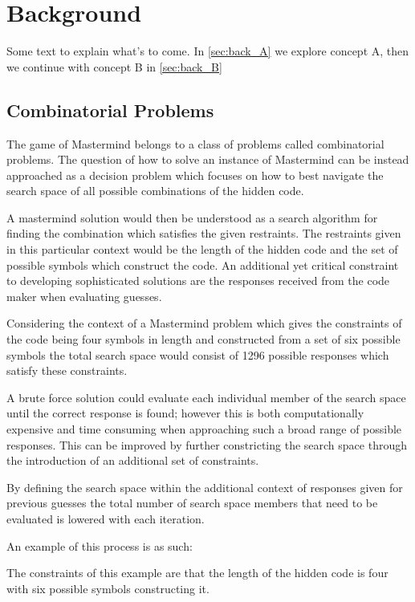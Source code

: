 \chapter{Background}
\label{cha:back}

Some text to explain what's to come. In \cref{sec:back_A} we explore concept A, then we continue with concept B in \cref{sec:back_B}

\section{Combinatorial Problems}

The game of Mastermind belongs to a class of problems called combinatorial problems. The question of how to solve an instance of Mastermind can be instead approached as a decision problem which focuses on how to best navigate the search space of all possible combinations of the hidden code.

A mastermind solution would then be understood as a search algorithm for finding the combination which satisfies the given restraints. The restraints given in this particular context would be the length of the hidden code and the set of possible symbols which construct the code. An additional yet critical constraint to developing sophisticated solutions are the responses received from the code maker when evaluating guesses.

Considering the context of a Mastermind problem which gives the constraints of the code being four symbols in length and constructed from a set of six possible symbols the total search space would consist of 1296 possible responses which satisfy these constraints.

A brute force solution could evaluate each individual member of the search space until the correct response is found; however this is both computationally expensive and time consuming when approaching such a broad range of possible responses. This can be improved by further constricting the search space through the introduction of an additional set of constraints.

By defining the search space within the additional context of responses given for previous guesses the total number of search space members that need to be evaluated is lowered with each iteration.

An example of this process is as such:

The constraints of this example are that the length of the hidden code is four with six possible symbols constructing it.

